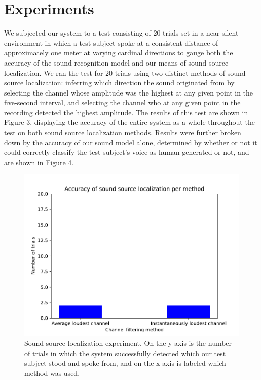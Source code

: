 \documentclass{article}
\begin{document}
\section{Experiments}
We subjected our system to a test consisting of 20 trials set in a near-silent environment in which a test subject spoke at a consistent distance of approximately one meter at varying cardinal directions to gauge both the accuracy of the sound-recognition model and our means of sound source localization. We ran the test for 20 trials using two distinct methods of sound source localization: inferring which direction the sound originated from by selecting the channel whose amplitude was the highest at any given point in the five-second interval, and selecting the channel who at any given point in the recording detected the highest amplitude. The results of this test are shown in Figure 3, displaying the accuracy of the entire system as a whole throughout the test on both sound source localization methods. Results were further broken down by the accuracy of our sound model alone, determined by whether or not it could correctly classify the test subject’s voice as human-generated or not, and are shown in Figure 4.
\begin{figure}
\begin{center}
\centerline{\includegraphics[width=\columnwidth]{localization_test}}
\caption{Sound source localization experiment. On the y-axis is the number of trials in which the system successfully detected which our test subject stood and spoke from, and on the x-axis is labeled which method was used.}
\end{center}
\end{figure} 
\end{document}
